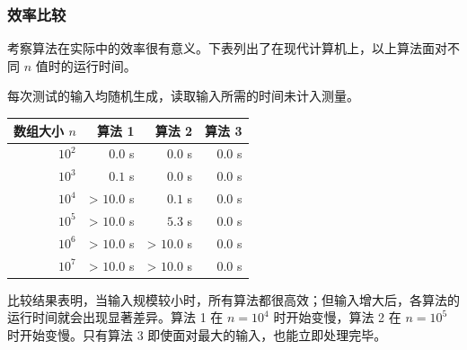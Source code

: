 \subsubsection{效率比较}

考察算法在实际中的效率很有意义。下表列出了在现代计算机上，以上算法面对不同 $n$ 值时的运行时间。

每次测试的输入均随机生成，读取输入所需的时间未计入测量。

\begin{center}
\begin{tabular}{rrrr}
数组大小 $n$ & 算法 1 & 算法 2 & 算法 3 \\
\hline
$10^2$ & $0.0$ s & $0.0$ s & $0.0$ s \\
$10^3$ & $0.1$ s & $0.0$ s & $0.0$ s \\
$10^4$ & > $10.0$ s & $0.1$ s & $0.0$ s \\
$10^5$ & > $10.0$ s & $5.3$ s & $0.0$ s \\
$10^6$ & > $10.0$ s & > $10.0$ s & $0.0$ s \\
$10^7$ & > $10.0$ s & > $10.0$ s & $0.0$ s \\
\end{tabular}
\end{center}

比较结果表明，当输入规模较小时，所有算法都很高效；但输入增大后，各算法的运行时间就会出现显著差异。算法 1 在 $n=10^4$ 时开始变慢，算法 2 在 $n=10^5$ 时开始变慢。只有算法 3 即使面对最大的输入，也能立即处理完毕。
